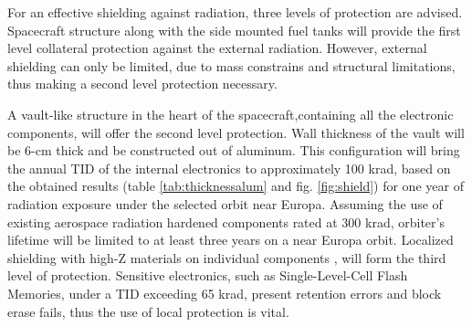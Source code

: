 For an effective shielding against radiation, three levels of protection are advised. Spacecraft structure along with the side mounted fuel tanks will provide the first level collateral protection against the external radiation. However, external shielding can only be limited, due to mass constrains and structural limitations, thus making a second level protection necessary. 

A vault-like structure in the heart of the spacecraft,containing all the electronic components, will offer the second level protection. Wall thickness of the vault will be 6-cm thick and be constructed out of aluminum. This configuration will bring the annual TID of the internal electronics to approximately 100 krad, based on the obtained results (table \ref{tab:thicknessalum} and fig. \ref{fig:shield}) for one year of radiation exposure under the selected orbit near Europa. Assuming the use of existing aerospace radiation hardened components rated at 300 krad, orbiter's lifetime will be limited to at least three years on a near Europa orbit. Localized shielding with high-Z materials on individual components , will form the third level of protection. Sensitive electronics, such as Single-Level-Cell Flash Memories, under a TID exceeding 65 krad, present retention errors and block erase fails, thus the use of local protection is vital. 
 
